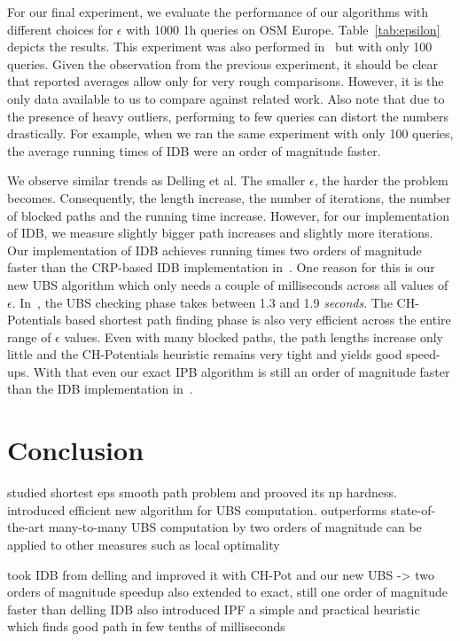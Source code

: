 \documentclass[a4paper,UKenglish,cleveref, autoref, thm-restate]{lipics-v2021}
\begin{document}
For our final experiment, we evaluate the performance of our algorithms with different choices for $\epsilon$ with 1000 1h queries on OSM Europe.
Table~\ref{tab:epsilon} depicts the results.
This experiment was also performed in~\cite{dss-tarrn-18} but with only 100 queries.
Given the observation from the previous experiment, it should be clear that reported averages allow only for very rough comparisons.
However, it is the only data available to us to compare against related work.
Also note that due to the presence of heavy outliers, performing to few queries can distort the numbers drastically.
For example, when we ran the same experiment with only 100 queries, the average running times of IDB were an order of magnitude faster.

We observe similar trends as Delling et al.
The smaller $\epsilon$, the harder the problem becomes.
Consequently, the length increase, the number of iterations, the number of blocked paths and the running time increase.
However, for our implementation of IDB, we measure slightly bigger path increases and slightly more iterations.
Our implementation of IDB achieves running times two orders of magnitude faster than the CRP-based IDB implementation in~\cite{dss-tarrn-18}.
One reason for this is our new UBS algorithm which only needs a couple of milliseconds across all values of $\epsilon$.
In~\cite{dss-tarrn-18}, the UBS checking phase takes between 1.3 and 1.9 \emph{seconds}.
The CH-Potentials based shortest path finding phase is also very efficient across the entire range of $\epsilon$ values.
Even with many blocked paths, the path lengths increase only little and the CH-Potentials heuristic remains very tight and yields good speed-ups.
With that even our exact IPB algorithm is still an order of magnitude faster than the IDB implementation in~\cite{dss-tarrn-18}.

\section{Conclusion}

studied shortest eps smooth path problem and prooved its np hardness.
introduced efficient new algorithm for UBS computation.
outperforms state-of-the-art many-to-many UBS computation by two orders of magnitude
can be applied to other measures such as local optimality

took IDB from delling and improved it with CH-Pot and our new UBS -> two orders of magnitude speedup
also extended to exact, still one order of magnitude faster than delling IDB
also introduced IPF a simple and practical heuristic which finds good path in few tenths of milliseconds
\end{document}
